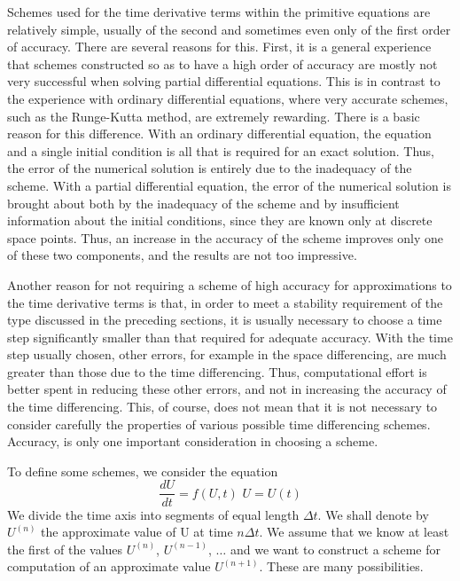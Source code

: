 Schemes used for the time derivative terms within the primitive equations are relatively simple, usually of the second and sometimes even only of the first order of accuracy. There are several reasons for this. First, it is a general experience that schemes constructed so as to have a high order of accuracy are mostly not very successful when solving partial differential equations. This is in contrast to the experience with ordinary differential equations, where very accurate schemes, such as the Runge-Kutta method, are extremely rewarding. There is a basic reason for this difference. With an ordinary differential equation, the equation and a single initial condition is all that is required for an exact solution. Thus, the error of the numerical solution is entirely due to the inadequacy of the scheme. With a partial differential equation, the error of the numerical solution is brought about both by the inadequacy of the scheme and by insufficient information about the initial conditions, since they are known only at discrete space points. Thus, an increase in the accuracy of the scheme improves only one of these two components, and the results are not too impressive.

Another reason for not requiring a scheme of high accuracy for approximations to the time derivative terms is that, in order to meet a stability requirement of the type discussed in the preceding sections, it is usually necessary to choose a time step significantly smaller than that required for adequate accuracy. With the time step usually chosen, other errors, for example in the space differencing, are much greater than those due to the time differencing. Thus, computational effort is better spent in reducing these other errors, and not in increasing the accuracy of the time differencing. This, of course, does not mean that it is not necessary to consider carefully the properties of various possible time differencing schemes. Accuracy, is only one important consideration in choosing a scheme.

To define some schemes, we consider the equation
\begin{equation}\label{eq.3.1.3}
    \frac{dU}{dt}= f(U,t) \,\, U=U(t)
\end{equation}
We divide the time axis into segments of equal length $\Delta t$. We shall denote by 
$U^{(n)}$ the approximate value of U at time $n\Delta t$. We assume that we know at least the first of the values $U^{(n)}$, $U^{(n-1)}$, $\dots$ and we want to construct a scheme for computation of an approximate value $U^{(n+1)}$. These are many possibilities.
